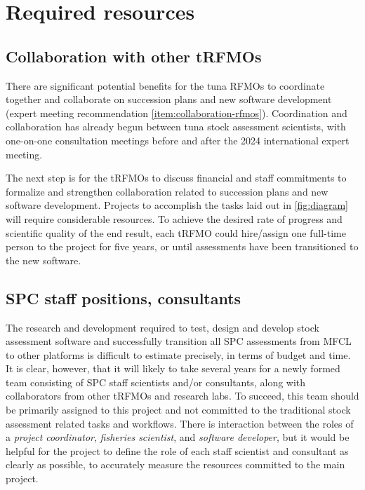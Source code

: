 \documentclass{SCreport}
\begin{document}
\section{Required resources}

\subsection{Collaboration with other tRFMOs}

There are significant potential benefits for the tuna RFMOs to coordinate
together and collaborate on succession plans and new software development
(expert meeting recommendation \ref{item:collaboration-rfmos}). Coordination and
collaboration has already begun between tuna stock assessment scientists, with
one-on-one consultation meetings before and after the 2024 international expert
meeting.

The next step is for the tRFMOs to discuss financial and staff commitments to
formalize and strengthen collaboration related to succession plans and new
software development. Projects to accomplish the tasks laid out in
\autoref{fig:diagram} will require considerable resources. To achieve the
desired rate of progress and scientific quality of the end result, each tRFMO
could hire/assign one full-time person to the project for five years, or until
assessments have been transitioned to the new software.

\subsection{SPC staff positions, consultants}

The research and development required to test, design and develop stock
assessment software and successfully transition all SPC assessments from MFCL to
other platforms is difficult to estimate precisely, in terms of budget and time.
It is clear, however, that it will likely to take several years for a newly
formed team consisting of SPC staff scientists and/or consultants, along with
collaborators from other tRFMOs and research labs. To succeed, this team should
be primarily assigned to this project and not committed to the traditional stock
assessment related tasks and workflows. There is interaction between the roles
of a \emph{project coordinator}, \emph{fisheries scientist}, and \emph{software
  developer}, but it would be helpful for the project to define the role of each
staff scientist and consultant as clearly as possible, to accurately measure the
resources committed to the main project.
\end{document}
